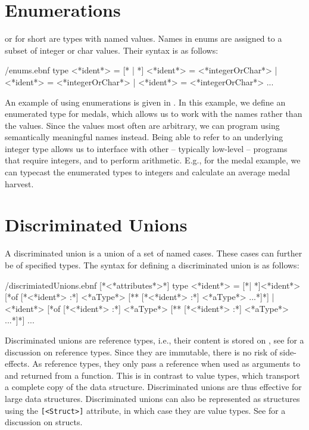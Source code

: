 \documentclass[fsharpnotes.tex]{subfiles}
\begin{document}
\section{Enumerations}
\label{sec:enums}
 or  for short are types with named values. Names in enums are assigned to a subset of integer or char values. Their syntax is as follows:
%
\begin{verbatimwrite}{\ebnf/enums.ebnf}
type <*ident*> = 
  [* | *] <*ident*> = <*integerOrChar*>
  | <*ident*> = <*integerOrChar*>
  | <*ident*> = <*integerOrChar*>
  ...
\end{verbatimwrite}
%
An example of using enumerations is given in .
%
%
In this example, we define an enumerated type for medals, which allows us to work with the names rather than the values. Since the values most often are arbitrary, we can program using semantically meaningful names instead. Being able to refer to an underlying integer type allows us to interface with other -- typically low-level -- programs that require integers, and to perform arithmetic. E.g., for the medal example, we can typecast the enumerated types to integers and calculate an average medal harvest.

\section{Discriminated Unions}
\label{sec:discriminatedUnions}
A discriminated union is a union of a set of named cases. These cases can further be of specified types. The syntax for defining a discriminated union is as follows:
%
\begin{verbatimwrite}{\ebnf/discrimiatedUnions.ebnf}
[*<*attributes*>*] 
type <*ident*> = 
  [*| *]<*ident*> [*of [*<*ident*> :*] <*aType*> [** [*<*ident*> :*] <*aType*> ...*]*]
  | <*ident*> [*of [*<*ident*> :*] <*aType*> [** [*<*ident*> :*] <*aType*> ...*]*]
  ...
\end{verbatimwrite}
%
Discriminated unions are reference types, i.e., their content is stored on , see  for a discussion on reference types. Since they are immutable, there is no risk of side-effects. As reference types, they only pass a reference when used as arguments to and returned from a function. This is in contrast to value types, which transport a complete copy of the data structure. Discriminated unions are thus effective for large data structures. Discriminated unions can also be represented as structures using the \lstinline{[<Struct>]} attribute, in which case they are value types. See  for a discussion on structs.
\end{document}

